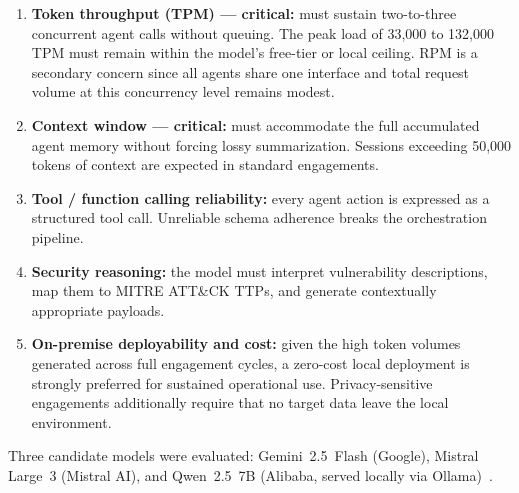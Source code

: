\documentclass[12pt,a4paper]{report}
\begin{document}
\begin{enumerate}
    \item \textbf{Token throughput (TPM) --- critical:} must sustain two-to-three
    concurrent agent calls without queuing. The peak load of 33{,}000 to
    132{,}000 TPM must remain within the model's free-tier or local ceiling.
    RPM is a secondary concern since all agents share one interface and total
    request volume at this concurrency level remains modest.
    \item \textbf{Context window --- critical:} must accommodate the full
    accumulated agent memory without forcing lossy summarization. Sessions
    exceeding 50{,}000 tokens of context are expected in standard engagements.
    \item \textbf{Tool / function calling reliability:} every agent action is
    expressed as a structured tool call. Unreliable schema adherence breaks
    the orchestration pipeline.
    \item \textbf{Security reasoning:} the model must interpret vulnerability
    descriptions, map them to MITRE ATT\&CK TTPs, and generate contextually
    appropriate payloads.
    \item \textbf{On-premise deployability and cost:} given the high token
    volumes generated across full engagement cycles, a zero-cost local
    deployment is strongly preferred for sustained operational use.
    Privacy-sensitive engagements additionally require that no target data
    leave the local environment.
\end{enumerate}

Three candidate models were evaluated: Gemini~2.5~Flash (Google),
Mistral Large~3 (Mistral AI), and Qwen~2.5~7B (Alibaba, served locally via
Ollama)~\cite{qwen25report}.
\end{document}
